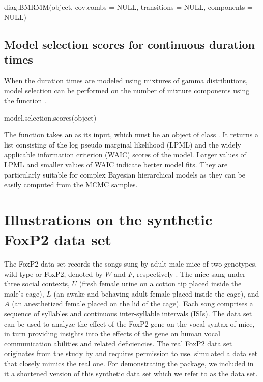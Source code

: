 \begin{example}
diag.BMRMM(object, cov.combs = NULL, transitions = NULL, components = NULL) 
\end{example}

\subsection{Model selection scores for continuous duration times}
When the {duration times} are modeled using mixtures of gamma distributions, model selection can be performed on the number of mixture components using the function .

\begin{example}
model.selection.scores(object) 
\end{example}

The function takes an  as its input, which must be an object of class . 
It returns a list consisting of the log pseudo marginal likelihood (LPML)  \citep{geisser1979predictive} and the widely applicable information criterion (WAIC) \citep{watanabe2010asymptotic} scores of the model.  
Larger values of LPML and smaller values of WAIC indicate better model fits.
They are particularly suitable for complex Bayesian hierarchical models as they can be easily computed from the MCMC samples. 





\section{Illustrations on the synthetic FoxP2 data set}\label{sec:foxp2}
The FoxP2 data set records the songs sung by adult male mice of two genotypes, wild type or FoxP2, denoted by $W$ and $F$, respectively \citep{Chabout_etal:2016}. 
The mice sang under three social contexts, $U$ (fresh female urine on a cotton tip placed inside the male's cage), $L$ (an awake and behaving adult female placed inside the cage), and $A$ (an anesthetized female placed on the lid of the cage). 
Each song comprises a sequence of syllables and continuous inter-syllable intervals (ISIs).
The data set can be used to analyze the effect of the FoxP2 gene on the vocal syntax of mice, 
in turn providing insights into the effects of the gene on human vocal communication abilities and related deficiencies.
The real FoxP2 data set originates from the study by \cite{Chabout_etal:2016} and requires permission to use. 
\cite{wu2021bayesian} simulated a data set that closely mimics the real one.
For demonstrating the  package, we included in it a shortened version of this synthetic data set 
which we refer to as the  data set. 
 
